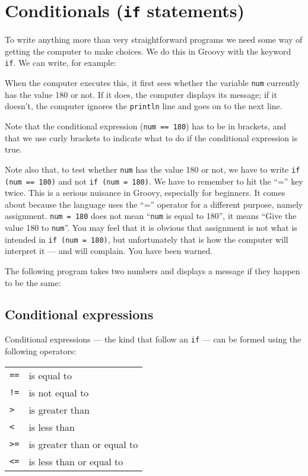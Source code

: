 \section{Conditionals (\texttt{if} statements)}

To write anything more than very straightforward programs we need some way
of getting the computer to make choices.
We do this in Groovy with the keyword \verb!if!.
We can write, for example:


When the computer executes this, it first sees whether the variable \verb!num!
currently has the value 180 or not.  If it does, the computer displays
its message; if it doesn't, the computer ignores the  \verb!println! line
and goes on to the next line.

Note that the conditional expression (\verb!num == 180!) has to be
in brackets, and that we use curly brackets to indicate what to do if
the conditional expression is true. 

Note also that, to test whether  \verb!num! has the value 180
or not, we have to write \verb!if (num == 180)! and not \verb!if (num = 180)!.
We have to remember to hit the ``='' key twice.
This is a serious nuisance in Groovy, especially for beginners.
It comes about because the language uses the ``='' operator for a different
purpose, namely assignment.  \verb!num = 180! does not mean ``\verb!num! is
equal to 180'', it means ``Give the value 180 to  \verb!num!''.  You may feel
that it is obvious that assignment is not what is intended in
\verb!if (num = 180)!, but unfortunately that is
how the computer will interpret it --- and will complain.
You have been warned.

The following program takes two numbers and displays a message if they happen
to be the same:


\subsection{Conditional expressions}
\label{sec:cond-expr}

Conditional expressions --- the kind that follow an \verb!if! ---
can be formed using the following operators:

\begin{tabular}{ll}
\verb+==+ &is equal to\\
\verb+!=+ &is not equal to\\
\verb+>+ &is greater than\\
\verb+<+ &is less than\\
\verb+>=+ & is greater than or equal to\\
\verb+<=+ &is less than or equal to\\
\end{tabular}

